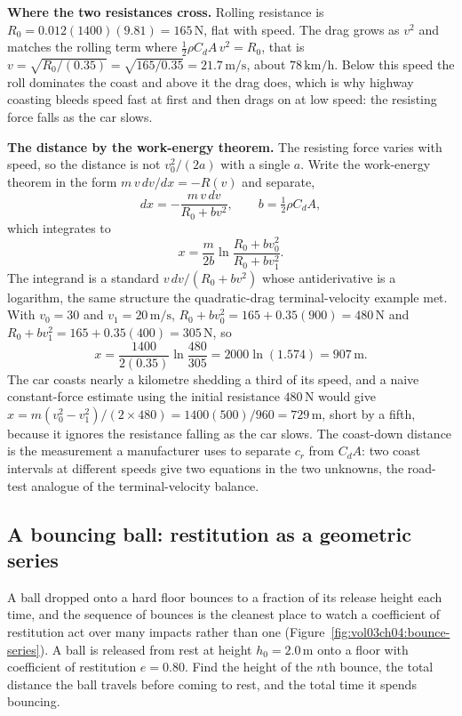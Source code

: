 \textbf{Where the two resistances cross.} Rolling resistance is
$R_{0}=0.012(1400)(9.81)=165\,\si{\newton}$, flat with speed. The drag
grows as $v^{2}$ and matches the rolling term where $\tfrac{1}{2}\rho
C_{d}A\,v^{2}=R_{0}$, that is $v=\sqrt{R_{0}/(0.35)}=\sqrt{165/0.35}=
21.7\,\si{\meter\per\second}$, about $78\,\si{\kilo\meter\per\hour}$.
Below this speed the roll dominates the coast and above it the drag
does, which is why highway coasting bleeds speed fast at first and then
drags on at low speed: the resisting force falls as the car slows.

\textbf{The distance by the work-energy theorem.} The resisting force
varies with speed, so the distance is not $v_{0}^{2}/(2a)$ with a single
$a$. Write the work-energy theorem in the form $m\,v\,dv/dx=-R(v)$ and
separate,
\[
dx=-\frac{m\,v\,dv}{R_{0}+bv^{2}}, \qquad b=\tfrac{1}{2}\rho C_{d}A,
\]
which integrates to
\[
x=\frac{m}{2b}\ln\!\frac{R_{0}+bv_{0}^{2}}{R_{0}+bv_{1}^{2}}.
\]
The integrand is a standard $v\,dv/(R_{0}+bv^{2})$ whose antiderivative
is a logarithm, the same structure the quadratic-drag terminal-velocity
example met. With $v_{0}=30$ and $v_{1}=20\,\si{\meter\per\second}$,
$R_{0}+bv_{0}^{2}=165+0.35(900)=480\,\si{\newton}$ and $R_{0}+bv_{1}^{2}
=165+0.35(400)=305\,\si{\newton}$, so
\[
x=\frac{1400}{2(0.35)}\ln\!\frac{480}{305}=2000\ln(1.574)=907\,\si{
\meter}.
\]
The car coasts nearly a kilometre shedding a third of its speed, and a
naive constant-force estimate using the initial resistance
$480\,\si{\newton}$ would give $x=m(v_{0}^{2}-v_{1}^{2})/(2\times 480)=
1400(500)/960=729\,\si{\meter}$, short by a fifth, because it ignores
the resistance falling as the car slows. The coast-down distance is the
measurement a manufacturer uses to separate $c_{r}$ from $C_{d}A$: two
coast intervals at different speeds give two equations in the two
unknowns, the road-test analogue of the terminal-velocity balance.

\subsection{A bouncing ball: restitution as a geometric series}

A ball dropped onto a hard floor bounces to a fraction of its release
height each time, and the sequence of bounces is the cleanest place to
watch a coefficient of restitution act over many impacts rather than
one (Figure~\ref{fig:vol03ch04:bounce-series}). A ball is released from
rest at height $h_{0}=2.0\,\si{\meter}$ onto a floor with coefficient of
restitution $e=0.80$. Find the height of the $n$th bounce, the total
distance the ball travels before coming to rest, and the total time it
spends bouncing.

